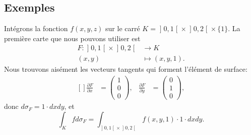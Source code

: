 \subsection{Exemples}

Intégrons la fonction \( f(x,y,z)\) sur le carré \( K=\mathopen] 0 , 1 \mathclose[\times \mathopen] 0 , 2 \mathclose[\times\{ 1 \}\). La première carte que nous pouvons utiliser est
\begin{equation}
	\begin{aligned}
		F\colon \mathopen] 0 , 1 \mathclose[\times\mathopen] 0 , 2 \mathclose[ & \to K            \\
		(x,y)                                                                  & \mapsto (x,y,1).
	\end{aligned}
\end{equation}
Nous trouvons aisément les vecteurs tangents qui forment l'élément de surface:
\begin{equation}
	\begin{aligned}[]
		\frac{ \partial F }{ \partial x } & =\begin{pmatrix}
			                                     1 \\
			                                     0 \\
			                                     0
		                                     \end{pmatrix},
		                                  & \frac{ \partial F }{ \partial y } & =\begin{pmatrix}
			                                                                         0 \\
			                                                                         1 \\
			                                                                         0
		                                                                         \end{pmatrix},
	\end{aligned}
\end{equation}
donc \( d\sigma_F=1\cdot dxdy\), et
\begin{equation}		\label{IntKSurcarrUn}
	\int_Kfd\sigma_F=\int_{\mathopen] 0 , 1 \mathclose[\times\mathopen] 0 , 2 \mathclose[}f(x,y,1)\cdot 1\cdot dxdy.
\end{equation}

